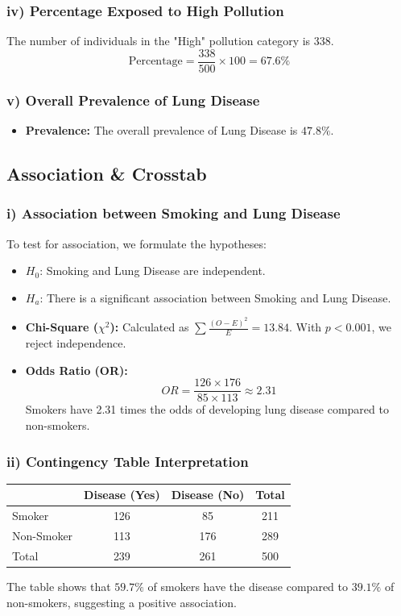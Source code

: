 \documentclass[12pt]{article}
\begin{document}
\subsubsection{iv) Percentage Exposed to High Pollution}
The number of individuals in the "High" pollution category is 338.
\[ \text{Percentage} = \frac{338}{500} \times 100 = 67.6\% \]
\subsubsection{v) Overall Prevalence of Lung Disease}
\begin{itemize}
Prevalence is defined as the total number of cases divided by the total population:
\[ \text{Prevalence} = \frac{239}{500} = 0.478 \text{ (47.8\%)} \]
\item \textbf{Prevalence:} The overall prevalence of Lung Disease is $47.8\%$.
\end{itemize}

\subsection{Association \& Crosstab}

\subsubsection{i) Association between Smoking and Lung Disease}
To test for association, we formulate the hypotheses:
\begin{itemize}
    \item $H_0$: Smoking and Lung Disease are independent.
    \item $H_a$: There is a significant association between Smoking and Lung Disease.

    \item \textbf{Chi-Square ($\chi^2$):} Calculated as $\sum \frac{(O-E)^2}{E} = 13.84$. With $p < 0.001$, we reject independence.
    \item \textbf{Odds Ratio (OR):} 
    \[ OR = \frac{126 \times 176}{85 \times 113} \approx 2.31 \]
    Smokers have 2.31 times the odds of developing lung disease compared to non-smokers.

\end{itemize}
\subsubsection{ii) Contingency Table Interpretation}
\begin{table}[h!]
\centering
\begin{tabular}{@{}lccc@{}}
\toprule
 & Disease (Yes) & Disease (No) & Total \\ \midrule
Smoker & 126 & 85 & 211 \\
Non-Smoker & 113 & 176 & 289 \\ \midrule
Total & 239 & 261 & 500 \\ \bottomrule
\end{tabular}
\end{table}
The table shows that $59.7\%$ of smokers have the disease compared to $39.1\%$ of non-smokers, suggesting a positive association.
\end{document}
